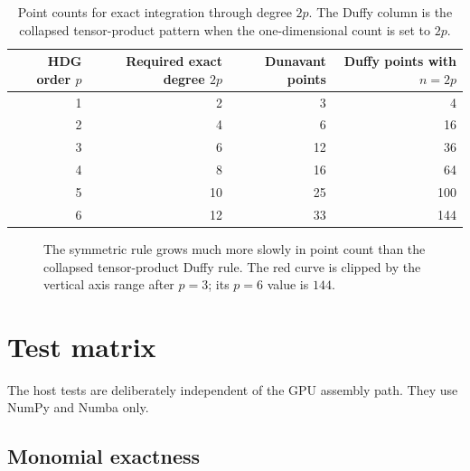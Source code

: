 \documentclass[11pt]{article}
\begin{document}
\begin{table}[htbp]
\centering
\begin{tabular}{rrrr}
\toprule
HDG order \(p\) & Required exact degree \(2p\) & Dunavant points & Duffy points with \(n=2p\) \\
\midrule
1 & 2  & 3  & 4 \\
2 & 4  & 6  & 16 \\
3 & 6  & 12 & 36 \\
4 & 8  & 16 & 64 \\
5 & 10 & 25 & 100 \\
6 & 12 & 33 & 144 \\
\bottomrule
\end{tabular}
\caption{Point counts for exact integration through degree \(2p\). The Duffy
column is the collapsed tensor-product pattern when the one-dimensional count
is set to \(2p\).}
\label{tab:point-counts}
\end{table}

\begin{figure}[htbp]
\centering
{}
\caption{The symmetric rule grows much more slowly in point count than the
collapsed tensor-product Duffy rule.  The red curve is clipped by the vertical
axis range after \(p=3\); its \(p=6\) value is \(144\).}
\label{fig:point-growth}
\end{figure}

\section{Test matrix}

The host tests are deliberately independent of the GPU assembly path.  They
use NumPy and Numba only.

\subsection{Monomial exactness}
\end{document}
